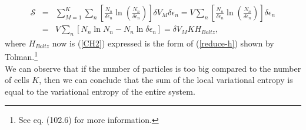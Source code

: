 \documentclass{article}
\newcommand{\de}{\delta}
\newcommand{\Ss}{\mathcal{S}}
\begin{document}
\begin{eqnarray}
    \Ss&=& \sum_{M=1}^{K} \sum_n
    \left[  
           \frac{N_{n}}{ \delta \epsilon_{n}} \ln 
           \left( 
                  \frac{N_{n}}{ \delta \epsilon_{n}}
           \right)
    \right]  \de V_M \delta \epsilon_{n} = V \sum_n
    \left[  
           \frac{N_{n}}{ \delta \epsilon_{n}} \ln 
           \left( 
                  \frac{N_{n}}{ \delta \epsilon_{n}}
           \right)
    \right] \delta \epsilon_{n} \nonumber \\
    &=& V \sum_n \left[N_n \ln N_n - N_n \ln \delta \epsilon_n  \right]=\de V_M K H_{Boltz},\label{h-quantic4}
\end{eqnarray}
where $H_{Boltz}$ now is (\ref{CH2}) expressed is the form of (\ref{reduce-h}) shown by Tolman.\footnote{See \cite{tolman} eq. (102.6) for more information.}\\
We can observe that if the number of particles is too big compared to the number of cells $K$, then we can conclude that the sum of the local variational entropy is equal to the variational entropy of the entire system.\\
\end{document}

